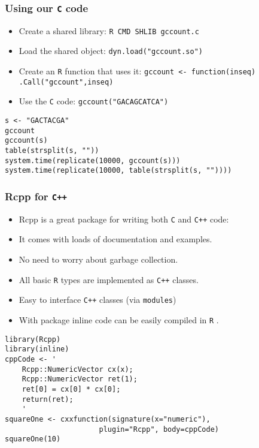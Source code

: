 \documentclass{beamer}
\newcommand{\R}{\texttt{R} }
\newcommand{\Rfunction}[1]{{\texttt{#1}}}
\newcommand{\Rpackage}[1]{{\mbox{\normalfont\textsf{#1}}}}
\begin{document}
\begin{frame}[fragile]
\frametitle{Using our \texttt{C} code}
\label{sec-2-4}

\begin{itemize}
\item Create a shared library: \texttt{R CMD SHLIB gccount.c}
\item Load the shared object: \Rfunction{dyn.load("gccount.so")}
\item Create an \R function that uses it: \Rfunction{gccount <- function(inseq) .Call("gccount",inseq)}
\item Use the \texttt{C} code: \Rfunction{gccount("GACAGCATCA")}
\end{itemize}


\begin{verbatim}
s <- "GACTACGA"
gccount
gccount(s)
table(strsplit(s, ""))
system.time(replicate(10000, gccount(s)))
system.time(replicate(10000, table(strsplit(s, ""))))
\end{verbatim}
\end{frame}
\begin{frame}[fragile]
\frametitle{\Rpackage{Rcpp} for \texttt{C++}}
\label{sec-2-5}

\begin{itemize}
\item \Rpackage{Rcpp} is a great package for writing both \texttt{C} and \texttt{C++} code:
\item It comes with loads of documentation and examples.
\item No need to worry about garbage collection.
\item All basic \R types are implemented as \texttt{C++} classes.
\item Easy to interface \texttt{C++} classes (via \texttt{modules})
\item With package \Rpackage{inline} code can be easily compiled in \R.
\end{itemize}
\small

\begin{verbatim}
library(Rcpp)
library(inline)
cppCode <- '
    Rcpp::NumericVector cx(x);
    Rcpp::NumericVector ret(1);
    ret[0] = cx[0] * cx[0];
    return(ret);
    '
squareOne <- cxxfunction(signature(x="numeric"), 
                      plugin="Rcpp", body=cppCode)
squareOne(10)
\end{verbatim}
\end{frame}
\end{document}
